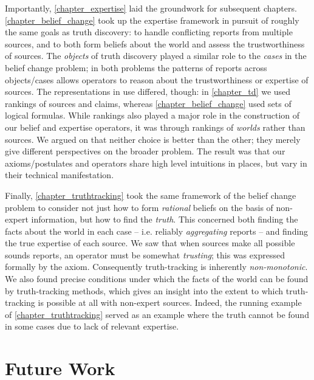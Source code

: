 Importantly, \cref{chapter_expertise} laid the groundwork for subsequent
chapters. \cref{chapter_belief_change} took up the expertise framework in
pursuit of roughly the same goals as truth discovery: to handle conflicting
reports from multiple sources, and to both form beliefs about the world and
assess the trustworthiness of sources. The \emph{objects} of truth discovery
played a similar role to the \emph{cases} in the belief change problem; in both
problems the patterns of reports across objects/cases allows operators to
reason about the trustworthiness or expertise of sources. The representations
in use differed, though: in \cref{chapter_td} we used rankings of sources and
claims, whereas \cref{chapter_belief_change} used sets of logical formulas.
While rankings also played a major role in the construction of our belief and
expertise operators, it was through rankings of \emph{worlds} rather than
sources. We argued on  that neither choice is
better than the other; they merely give different perspectives on the broader
problem. The result was that our axioms/postulates and operators share high
level intuitions in places, but vary in their technical manifestation.

{
    

Finally, \cref{chapter_truthtracking} took the same framework of the belief
change problem to consider not just how to form \emph{rational} beliefs on the
basis of non-expert information, but how to find the \emph{truth}. This
concerned both finding the facts about the world in each case -- i.e. reliably
\emph{aggregating} reports -- and finding the true expertise of each source.
We saw that when sources make all possible sounds reports, an operator must be
somewhat \emph{trusting}; this was expressed formally by the \credulity{}
axiom. Consequently truth-tracking is inherently \emph{non-monotonic}. We also
found precise conditions under which the facts of the world can be found by
truth-tracking methods, which gives an insight into the extent to which
truth-tracking is possible at all with non-expert sources. Indeed, the running
example of \cref{chapter_truthtracking} served as an example where the truth
cannot be found in some cases due to lack of relevant expertise.

}

\section{Future Work}

